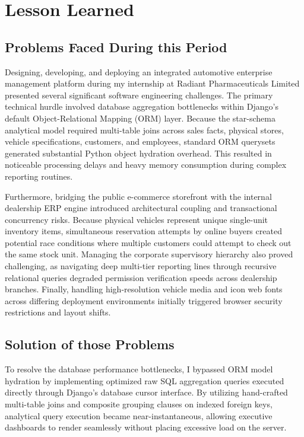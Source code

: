 \chapter{Lesson Learned}

\section{Problems Faced During this Period}
Designing, developing, and deploying an integrated automotive enterprise management platform during my internship at Radiant Pharmaceuticals Limited presented several significant software engineering challenges. The primary technical hurdle involved database aggregation bottlenecks within Django's default Object-Relational Mapping (ORM) layer. Because the star-schema analytical model required multi-table joins across sales facts, physical stores, vehicle specifications, customers, and employees, standard ORM querysets generated substantial Python object hydration overhead. This resulted in noticeable processing delays and heavy memory consumption during complex reporting routines.

Furthermore, bridging the public e-commerce storefront with the internal dealership ERP engine introduced architectural coupling and transactional concurrency risks. Because physical vehicles represent unique single-unit inventory items, simultaneous reservation attempts by online buyers created potential race conditions where multiple customers could attempt to check out the same stock unit. Managing the corporate supervisory hierarchy also proved challenging, as navigating deep multi-tier reporting lines through recursive relational queries degraded permission verification speeds across dealership branches. Finally, handling high-resolution vehicle media and icon web fonts across differing deployment environments initially triggered browser security restrictions and layout shifts.

\section{Solution of those Problems}
To resolve the database performance bottlenecks, I bypassed ORM model hydration by implementing optimized raw SQL aggregation queries executed directly through Django's database cursor interface. By utilizing hand-crafted multi-table joins and composite grouping clauses on indexed foreign keys, analytical query execution became near-instantaneous, allowing executive dashboards to render seamlessly without placing excessive load on the server.

